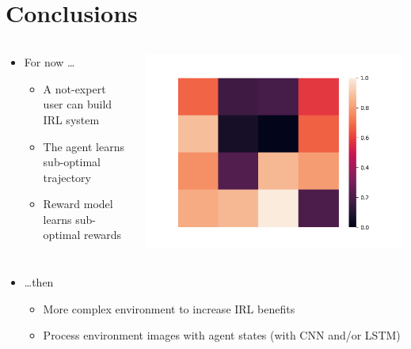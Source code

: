 \section{Conclusions}

\begin{frame}

	\begin{columns}
		
		\begin{column}{0.5\textwidth}
			
			\begin{itemize}
				\item For now \ldots
				\begin{itemize}
					\item A not-expert user can build IRL system
					\item The agent learns sub-optimal trajectory 
					\item Reward model learns sub-optimal rewards
				\end{itemize}
			\end{itemize}
		
		\end{column}
	
		\begin{column}{0.6\textwidth}
			\centering
			\includegraphics[width=0.6\linewidth]{images/max_heatmap.png}
		\end{column}
		
	\end{columns}
	
	\vspace{0.5cm}
	
	\begin{itemize}
		\item<2-> \ldots then
		\begin{itemize}
			\item<2-> More complex environment to increase IRL benefits
			\item<2-> Process environment images with agent states (with CNN and/or LSTM)
		\end{itemize}
	\end{itemize}



\end{frame}
